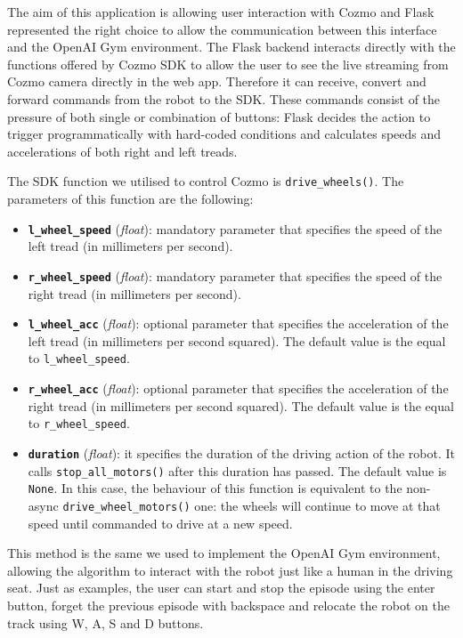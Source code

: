 The aim of this application is allowing user interaction with Cozmo and Flask represented the right choice to allow the communication between this interface and the OpenAI Gym environment.
The Flask backend interacts directly with the functions offered by Cozmo SDK to allow the user to see the live streaming from Cozmo camera directly in the web app.
Therefore it can receive, convert and forward commands from the robot to the SDK.
These commands consist of the pressure of both single or combination of buttons: Flask decides the action to trigger programmatically with hard-coded conditions and calculates speeds and accelerations of both right and left treads.

The SDK function we utilised to control Cozmo is \texttt{drive\_wheels()}.
The parameters of this function are the following:

\begin{itemize}
    \item \textbf{\texttt{l\_wheel\_speed}} (\textit{float}): mandatory parameter that specifies the speed of the left tread (in millimeters per second).
    \item \textbf{\texttt{r\_wheel\_speed}} (\textit{float}): mandatory parameter that specifies the speed of the right tread (in millimeters per second).
    \item \textbf{\texttt{l\_wheel\_acc}} (\textit{float}): optional parameter that specifies the acceleration of the left tread (in millimeters per second squared).
          The default value is the equal to \texttt{l\_wheel\_speed}.
    \item \textbf{\texttt{r\_wheel\_acc}} (\textit{float}): optional parameter that specifies the acceleration of the right tread (in millimeters per second squared).
          The default value is the equal to \texttt{r\_wheel\_speed}.
    \item \textbf{\texttt{duration}} (\textit{float}): it specifies the duration of the driving action of the robot.
          It calls \texttt{stop\_all\_motors()} after this duration has passed.
          The default value is \texttt{None}.
          In this case, the behaviour of this function is equivalent to the non-async \texttt{drive\_wheel\_motors()} one: the wheels will continue to move at that speed until commanded to drive at a new speed.
\end{itemize}

This method is the same we used to implement the OpenAI Gym environment, allowing the algorithm to interact with the robot just like a human in the driving seat.
Just as examples, the user can start and stop the episode using the enter button, forget the previous episode with backspace and relocate the robot on the track using W, A, S and D buttons.

